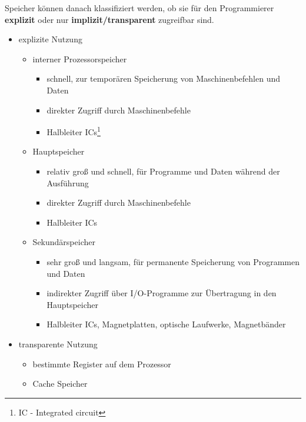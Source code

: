 \documentclass[a4paper,12pt,leqno]{article}
\begin{document}
Speicher können danach klassifiziert werden, ob sie für den Programmierer \textbf{explizit} oder nur \textbf{implizit/transparent} zugreifbar sind.
\begin{itemize}
\item explizite Nutzung
	\begin{itemize}
	\item interner Prozessorspeicher
		\begin{itemize}
		\item schnell, zur temporären Speicherung von Maschinenbefehlen und Daten
		\item direkter Zugriff durch Maschinenbefehle
		\item Halbleiter ICs\footnote{IC - Integrated circuit}
		\end{itemize}
	\item Hauptspeicher
		\begin{itemize}
		\item relativ groß und schnell, für Programme und Daten während der Ausführung
		\item direkter Zugriff durch Maschinenbefehle
		\item Halbleiter ICs
		\end{itemize}
	\item Sekundärspeicher
		\begin{itemize}
		\item sehr groß und langsam, für permanente Speicherung von Programmen und Daten
		\item indirekter Zugriff über I/O-Programme zur Übertragung in den Hauptspeicher
		\item Halbleiter ICs, Magnetplatten, optische Laufwerke, Magnetbänder
		\end{itemize}
	\end{itemize}
\item transparente Nutzung
	\begin{itemize}
	\item bestimmte Register auf dem Prozessor
	\item Cache Speicher
	\end{itemize}
\end{itemize} 
\end{document}
